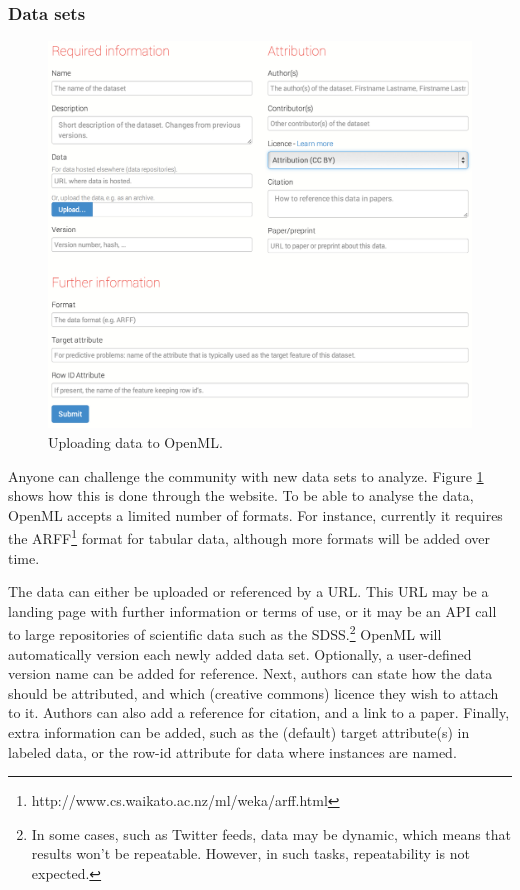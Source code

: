 \documentclass{acmproc-sp}
\begin{document}
\subsubsection{Data sets}
\begin{figure}
\centering
\includegraphics[width=\columnwidth]{openml-data.png}
\caption{\label{fig:data}Uploading data to OpenML.}
\end{figure}

Anyone can challenge the community with new data sets to analyze. Figure \ref{fig:data} shows how this is done through the website. To be able to analyse the data, OpenML accepts a limited number of formats. For instance, currently it requires the ARFF\footnote{http://www.cs.waikato.ac.nz/ml/weka/arff.html} format for tabular data, although more formats will be added over time.

The data can either be uploaded or referenced by a URL. This URL may be a landing page with further information or terms of use, or it may be an API call to large repositories of scientific data such as the SDSS.\footnote{In some cases, such as Twitter feeds, data may be dynamic, which means that results won't be repeatable. However, in such tasks, repeatability is not expected.} OpenML will automatically version each newly added data set. Optionally, a user-defined version name can be added for reference. Next, authors can state how the data should be attributed, and which (creative commons) licence they wish to attach to it. Authors can also add a reference for citation, and a link to a paper. Finally, extra information can be added, such as the (default) target attribute(s) in labeled data, or the row-id attribute for data where instances are named.
\end{document}

